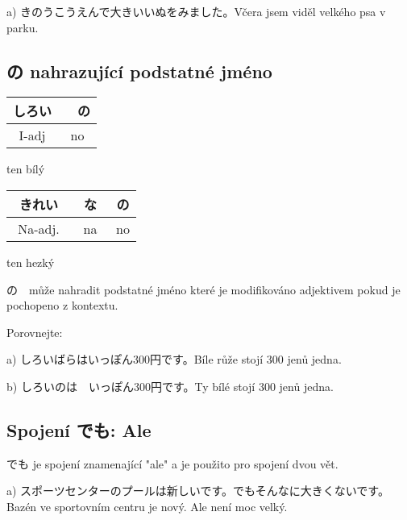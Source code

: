 a) きのうこうえんで大きいいぬをみました。Včera jsem viděl velkého psa v parku.



\subsection{の nahrazující podstatné jméno}
\begin{center}
\begin{tabular}{|c|c|}
\hline
しろい&　の\\
\hline
I-adj&no\\
\hline
\end{tabular}
\end{center}
ten bílý


\begin{center}  
\begin{tabular}{|c|c|c|}
\hline
きれい　&な　&の\\
\hline
Na-adj. & na&no\\
\hline
\end{tabular}
\end{center}
ten hezký

の　může nahradit podstatné jméno které je modifikováno adjektivem pokud je pochopeno z kontextu. 


Porovnejte:

a) しろいばらはいっぽん300円です。Bíle růže stojí 300 jenů jedna.

b) しろいのは　いっぽん300円です。Ty bílé stojí 300 jenů jedna.


\subsection{Spojení でも: Ale}

でも je spojení znamenající "ale" a je použito pro spojení dvou vět.

a) スポーツセンターのプールは新しいです。でもそんなに大きくないです。　Bazén ve sportovním centru je nový. Ale není moc velký.











